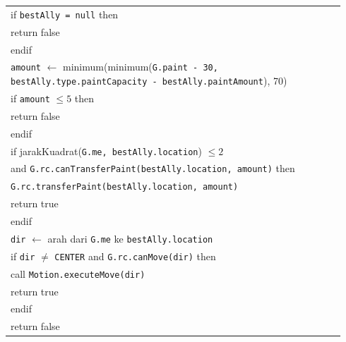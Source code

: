 \documentclass{article}
\newenvironment{pseudobox}
{
\centering
\begin{longtable}{|p{0.94\linewidth}|}
\hline
}
{
\\ \hline
\end{longtable}
\vspace{0.05cm}
}
\begin{document}
\begin{enumerate}[label=\alph*.]
\begin{enumerate}[label=\alph*.]
\begin{pseudobox}
\hspace*{1.5em}if \texttt{bestAlly = null} then \\
\hspace*{3em}return false \\
\hspace*{1.5em}endif \\

\hspace*{1.5em}\texttt{amount} $\leftarrow$ minimum(minimum(\texttt{G.paint - 30, bestAlly.type.paintCapacity - bestAlly.paintAmount}), 70) \\

\hspace*{1.5em}if \texttt{amount} $\leq 5$ then \\
\hspace*{3em}return false \\
\hspace*{1.5em}endif \\

\hspace*{1.5em}if jarakKuadrat(\texttt{G.me, bestAlly.location}) $\leq 2$ \\
\hspace*{3em}and \texttt{G.rc.canTransferPaint(bestAlly.location, amount)} then \\
\hspace*{3em}\texttt{G.rc.transferPaint(bestAlly.location, amount)} \\
\hspace*{3em}return true \\
\hspace*{1.5em}endif \\

\hspace*{1.5em}\texttt{dir} $\leftarrow$ arah dari \texttt{G.me} ke \texttt{bestAlly.location} \\
\hspace*{1.5em}if \texttt{dir} $\neq$ \texttt{CENTER} and \texttt{G.rc.canMove(dir)} then \\
\hspace*{3em}call \texttt{Motion.executeMove(dir)} \\
\hspace*{3em}return true \\
\hspace*{1.5em}endif \\

\hspace*{1.5em}return false
\end{pseudobox}


\end{enumerate}
\end{enumerate}
\end{document}
